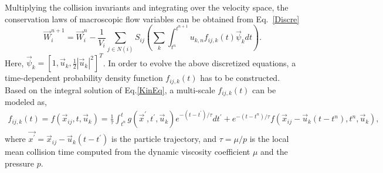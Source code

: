 \documentclass[3p,12pt]{elsarticle}
\begin{document}
	Multiplying the collision invariants and integrating over the velocity space, the conservation laws of macroscopic flow variables can be obtained from Eq.~\eqref{Discre}
	\begin{equation}
		\vec{W}_i^{n+1} = \vec{W}_i^{n} - \frac{1}{V_i}\sum_{j\in N(i)} S_{ij} \left(\sum_k \int _{t^{n}}^{t^{n+1}} u_{k,n}f_{ij,k}(t)\vec{\psi}_k dt \right).
		\label{macroupdate}\end{equation}
	Here, $\vec{\psi}_k = \left[ 1, \vec{u}_k, \frac{1}{2} |\vec{u}_k|^2 \right]^T$. In order to evolve the above discretized equations, a time-dependent probability density function $f_{ij,k}(t)$ has to be constructed. Based on the integral solution of Eq.\eqref{KinEq}, a multi-scale $f_{ij,k}(t)$ can be modeled as,
	\begin{equation}
		\begin{aligned} f_{i j, k}(t)=f\left(\vec{x}_{i j}, t, \vec{u}_{k}\right) =\frac{1}{\tau} \int_{t^{n}}^{t} g\left(\vec{x}^{\prime}, t^{\prime}, \vec{u}_{k}\right) e^{-\left(t-t^{\prime}\right) / \tau} d t^{\prime}  +e^{-\left(t-t^{n}\right) / \tau} f\left(\vec{x}_{i j}-\vec{u}_{k}\left(t-t^{n}\right), t^{n}, \vec{u}_{k} \right), \end{aligned}
		\label{integralSol}\end{equation}
	where $\vec{x^{\prime}} = \vec{x}_{ij} - \vec{u}_k (t - t^{\prime})$ is the particle trajectory, and $\tau = \mu / p$ is the local mean collision time computed from the dynamic viscosity coefficient $\mu$ and the pressure $p$.
	
\end{document}
